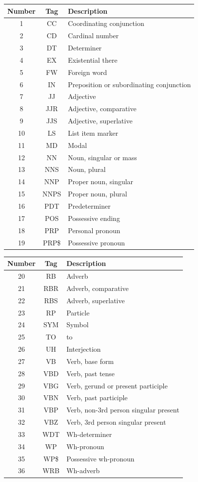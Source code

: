 \documentclass[11pt]{article}
\begin{document}
\noindent
\begin{minipage}[t][][t]{0.5\linewidth}
	\begin{tabularx}{\linewidth}{c|c|X}
		\textbf{Number} & \textbf{Tag} & \textbf{Description} \\
		\hline
		1 & CC & Coordinating conjunction \\
		2 & CD & Cardinal number \\
		3 & DT & Determiner \\
		4 & EX & Existential there \\
		5 & FW & Foreign word \\
		6 & IN & Preposition or subordinating conjunction \\
		7 & JJ & Adjective \\
		8 & JJR & Adjective, comparative \\
		9 & JJS & Adjective, superlative \\
		10 & LS & List item marker \\
		11 & MD & Modal \\
		12 & NN & Noun, singular or mass \\
		13 & NNS & Noun, plural \\
		14 & NNP & Proper noun, singular \\
		15 & NNPS & Proper noun, plural \\
		16 & PDT & Predeterminer \\
		17 & POS & Possessive ending \\
		18 & PRP & Personal pronoun \\
		19 & PRP\$ & Possessive pronoun
	\end{tabularx}
\end{minipage}
\begin{minipage}[t][][t]{0.5\linewidth}
	\begin{tabularx}{\linewidth}{c|c|X}
		\textbf{Number} & \textbf{Tag} & \textbf{Description} \\
		\hline
		20 & RB & Adverb \\
		21 & RBR & Adverb, comparative \\
		22 & RBS & Adverb, superlative \\
		23 & RP & Particle \\
		24 & SYM & Symbol \\
		25 & TO & to \\
		26 & UH & Interjection \\
		27 & VB & Verb, base form \\
		28 & VBD & Verb, past tense \\
		29 & VBG & Verb, gerund or present participle \\
		30 & VBN & Verb, past participle \\
		31 & VBP & Verb, non-3rd person singular present \\
		32 & VBZ & Verb, 3rd person singular present \\
		33 & WDT & Wh-determiner \\
		34 & WP & Wh-pronoun \\
		35 & WP\$ & Possessive wh-pronoun \\
		36 & WRB & Wh-adverb
	\end{tabularx}
\end{minipage}
\end{document}
